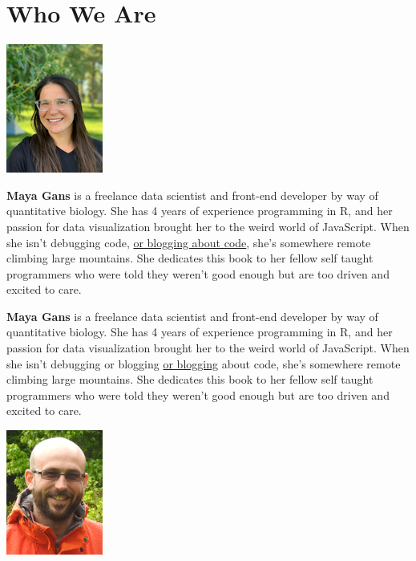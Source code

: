 \section{Who We Are}\label{s:intro-contributors}

\begin{center}
  \includegraphics{figures/gans-maya.png}
\end{center}

\noindent
\textbf{Maya Gans} is a freelance data scientist and front-end developer by way of quantitative biology. 
She has 4 years of experience programming in R, 
and her passion for data visualization brought her to the weird world of JavaScript.
When she isn't debugging code, \href{https://maya.rbind.io/}{or blogging about code}, 
she's somewhere remote climbing large mountains. 
She dedicates this book to her fellow self taught programmers 
who were told they weren't good enough but are too driven and excited to care.

\textbf{Maya Gans} is a freelance data scientist and front-end developer by way of quantitative biology. 
She has 4 years of experience programming in R, 
and her passion for data visualization brought her to the weird world of JavaScript. 
When she isn't debugging or blogging \href{https://maya.rbind.io/}{or blogging} about code, 
she's somewhere remote climbing large mountains. 
She dedicates this book to her fellow self taught programmers who were told they weren’t good enough
but are too driven and excited to care.

\begin{center}
  \includegraphics{figures/hodges-toby.png}
\end{center}

